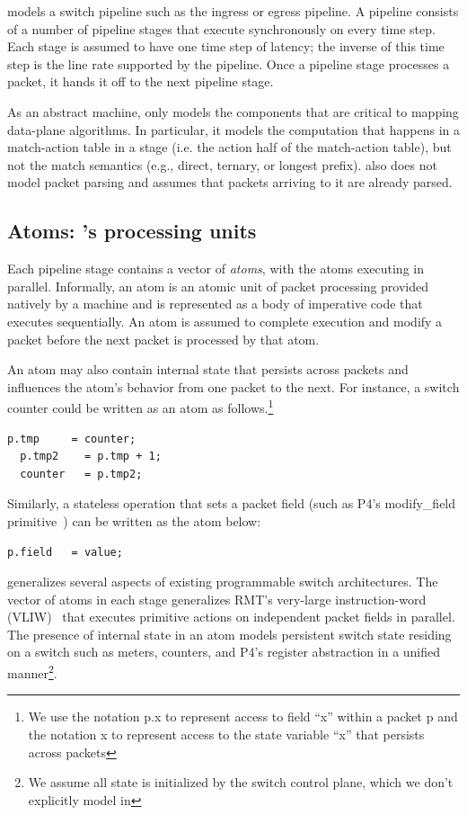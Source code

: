 \absmachine models a switch pipeline such as the ingress or egress pipeline. A
pipeline consists of a number of pipeline stages that execute synchronously on
every time step. Each stage is assumed to have one time step of latency;
the inverse of this time step is the line rate supported by the pipeline. Once
a pipeline stage processes a packet, it hands it off to the next pipeline
stage.

As an abstract machine, \absmachine only models the components that are
critical to mapping data-plane algorithms. In particular, it models the
computation that happens in a match-action table in a stage (i.e. the action
half of the match-action table), but not the match semantics (e.g., direct,
ternary, or longest prefix). \absmachine also does not model packet parsing and
assumes that packets arriving to it are already parsed.

\subsection{Atoms: \absmachine's processing units}

Each pipeline stage contains a vector of \textit{atoms}, with the atoms
executing in parallel. Informally, an atom is an atomic unit of packet
processing provided natively by a \absmachine machine and is represented
as a body of imperative code that executes sequentially. An atom is assumed to
complete execution and modify a packet before the next packet is processed by
that atom.

An atom may also contain internal state that persists across packets and
influences the atom's behavior from one packet to the next. For instance, a
switch counter could be written as an atom as follows.\footnote{We use the
  notation p.x to represent access to field ``x'' within a packet p and the
  notation x to represent access to the state variable ``x'' that persists across packets}
  \begin{lstlisting}[style=customc]
  p.tmp     = counter;
  p.tmp2    = p.tmp + 1;
  counter   = p.tmp2;
  \end{lstlisting}
Similarly, a stateless operation that sets a packet field (such as P4's
modify\_field primitive~\cite{p4spec}) can be written as the atom
below:
\begin{lstlisting}[style=customc]
p.field   = value;
\end{lstlisting}

\absmachine generalizes several aspects of existing programmable switch
architectures. The vector of atoms in each stage generalizes RMT's very-large
instruction-word (VLIW)~\cite{rmt} that executes primitive actions on
independent packet fields in parallel. The presence of internal state in an
atom models persistent switch state residing on a switch such as meters,
counters, and P4's register abstraction in a unified manner\footnote{We assume
all state is initialized by the switch control plane, which we don't explicitly
model in \absmachine}.

